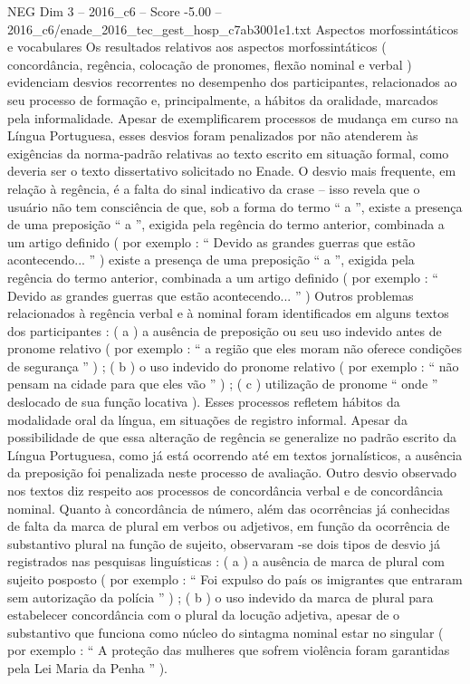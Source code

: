 \begin{textsample}{NEG Dim 3 – 2016\_c6 – Score -5.00 – 2016\_c6/enade\_2016\_tec\_gest\_hosp\_c7ab3001e1.txt}
Aspectos morfossintáticos e vocabulares Os resultados relativos aos aspectos morfossintáticos ( concordância, regência, colocação de pronomes, flexão nominal e verbal ) evidenciam desvios recorrentes no desempenho dos participantes, relacionados ao seu processo de formação e, principalmente, a hábitos da oralidade, marcados pela informalidade.
Apesar de exemplificarem processos de mudança em curso na Língua Portuguesa, esses desvios foram penalizados por não atenderem às exigências da norma-padrão relativas ao texto escrito em situação formal, como deveria ser o texto dissertativo solicitado no Enade.
O desvio mais frequente, em relação à regência, é a falta do sinal indicativo da crase – isso revela que o usuário não tem consciência de que, sob a forma do termo “ a ”, existe a presença de uma preposição “ a ”, exigida pela regência do termo anterior, combinada a um artigo definido ( por exemplo : “ Devido as grandes guerras que estão acontecendo... ” ) existe a presença de uma preposição “ a ”, exigida pela regência do termo anterior, combinada a um artigo definido ( por exemplo : “ Devido as grandes guerras que estão acontecendo... ” ) Outros problemas relacionados à regência verbal e à nominal foram identificados em alguns textos dos participantes : ( a ) a ausência de preposição ou seu uso indevido antes de pronome relativo ( por exemplo : “ a região que eles moram não oferece condições de segurança ” ) ; ( b ) o uso indevido do pronome relativo ( por exemplo : “ não pensam na cidade para que eles vão ” ) ; ( c ) utilização de pronome “ onde ” deslocado de sua função locativa ).
Esses processos refletem hábitos da modalidade oral da língua, em situações de registro informal.
Apesar da possibilidade de que essa alteração de regência se generalize no padrão escrito da Língua Portuguesa, como já está ocorrendo até em textos jornalísticos, a ausência da preposição foi penalizada neste processo de avaliação.
Outro desvio observado nos textos diz respeito aos processos de concordância verbal e de concordância nominal.
Quanto à concordância de número, além das ocorrências já conhecidas de falta da marca de plural em verbos ou adjetivos, em função da ocorrência de substantivo plural na função de sujeito, observaram -se dois tipos de desvio já registrados nas pesquisas linguísticas : ( a ) a ausência de marca de plural com sujeito posposto ( por exemplo : “ Foi expulso do país os imigrantes que entraram sem autorização da polícia ” ) ; ( b ) o uso indevido da marca de plural para estabelecer concordância com o plural da locução adjetiva, apesar de o substantivo que funciona como núcleo do sintagma nominal estar no singular ( por exemplo : “ A proteção das mulheres que sofrem violência foram garantidas pela Lei Maria da Penha ” ).

\end{textsample}
